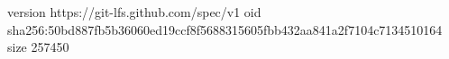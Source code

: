 version https://git-lfs.github.com/spec/v1
oid sha256:50bd887fb5b36060ed19ccf8f5688315605fbb432aa841a2f7104c7134510164
size 257450

